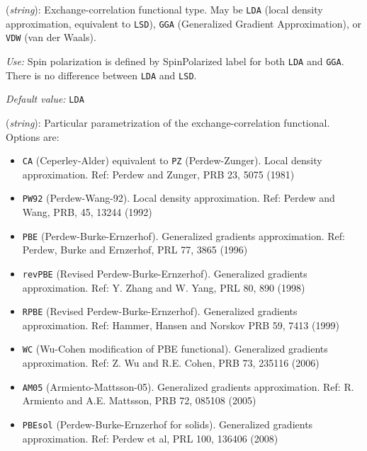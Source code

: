 \documentclass[11pt]{article}
\begin{document}
\begin{description}
\itemsep 10pt
\parsep 0pt


\item[{\bf XC.functional}] ({\it string}): 
Exchange-correlation functional type. May be {\tt LDA} 
(local density approximation, equivalent to {\tt LSD}),
{\tt GGA} (Generalized Gradient Approximation), or
{\tt VDW} (van der Waals).

{\it Use:} Spin polarization is defined by SpinPolarized label for
both {\tt LDA} and {\tt GGA}. There is no difference between {\tt LDA}
and {\tt LSD}.

{\it Default value:} {\tt LDA}


\item[{\bf XC.authors}] ({\it string}):
Particular parametrization of the
exchange-correlation functional. Options are:
\begin{itemize}
\item {\tt CA} (Ceperley-Alder) 
equivalent to {\tt PZ} (Perdew-Zunger). 
Local density approximation.
Ref: Perdew and Zunger, PRB 23, 5075 (1981)
\item {\tt PW92} (Perdew-Wang-92). 
Local density approximation.
Ref: Perdew and Wang, PRB, 45, 13244 (1992)
\item {\tt PBE} (Perdew-Burke-Ernzerhof). Generalized gradients
approximation.  Ref: Perdew, Burke and Ernzerhof, PRL 77, 3865
(1996) 
\item {\tt revPBE} (Revised Perdew-Burke-Ernzerhof). Generalized gradients
approximation.  Ref: Y. Zhang and W. Yang, PRL 80, 890
(1998) 
\item {\tt RPBE} (Revised Perdew-Burke-Ernzerhof). Generalized gradients
approximation.  Ref: Hammer, Hansen and Norskov PRB 59, 7413
(1999) 
\item {\tt WC} (Wu-Cohen modification of PBE functional). Generalized gradients
approximation.  Ref: Z. Wu and R.E. Cohen, PRB 73, 235116 (2006)
 
\item {\tt AM05} (Armiento-Mattsson-05). Generalized gradients
approximation.  Ref: R. Armiento and A.E. Mattsson, PRB 72, 085108 (2005)
 
\item {\tt PBEsol} (Perdew-Burke-Ernzerhof for solids). Generalized gradients
approximation.  Ref: Perdew et al, PRL 100, 136406
(2008) 

\end{itemize}
\end{description}
\end{document}
